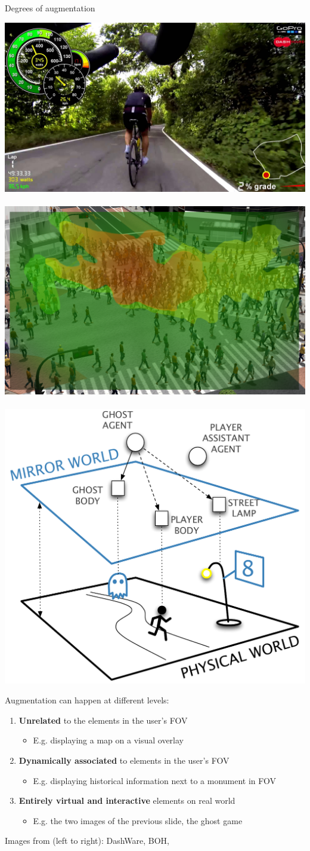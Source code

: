 \documentclass[presentation]{beamer} %
\begin{document}
\begin{frame}{Degrees of augmentation}
  \begin{center}
    \includegraphics[height=.2\textwidth]{images/dashware}
    ~
    \includegraphics[height=.2\textwidth]{images/crowd01}
    ~
    \includegraphics[height=.2\textwidth]{images/game2}
  \end{center}
  Augmentation can happen at different levels:
  \begin{enumerate}
    \item \textbf{Unrelated} to the elements in the user's FOV
      \begin{itemize}
        \item E.g. displaying a map on a visual overlay
      \end{itemize}
    \item \textbf{Dynamically associated} to elements in the user's FOV
      \begin{itemize}
        \item E.g. displaying historical information next to a monument in FOV
      \end{itemize}
    \item \textbf{Entirely virtual and interactive} elements on real world
      \begin{itemize}
        \item E.g. the two images of the previous slide, the ghost game \cite{MirrorWorlds}
      \end{itemize}
  \end{enumerate}
  \begin{center}
    \tiny{Images from (left to right): DashWare, BOH, \cite{MirrorWorlds}}
  \end{center}
\end{frame}
\end{document}
